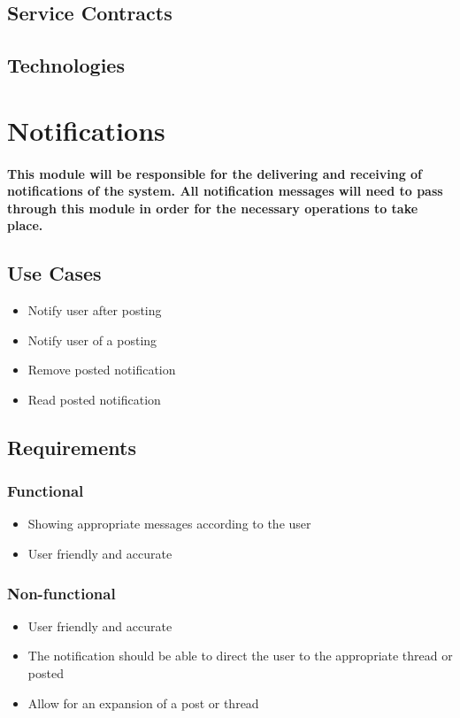 \documentclass[12pt]{article}
\begin{document}
\subsection{Service Contracts}
\paragraph{}
	 	 
\subsection{Technologies}
\paragraph{}
\section{Notifications}
\paragraph{This module will be responsible for the delivering and receiving of notifications of the system. All notification messages will need to pass through this module in order for the necessary operations to take place.}
\subsection{Use Cases}
\begin{itemize}
\item Notify user after posting
\item Notify user of a posting
\item Remove posted notification 
\item Read posted notification
\end{itemize}
\subsection{Requirements}
\subsubsection{Functional}
\begin{itemize}
\item Showing appropriate messages according to the user
\item User friendly and accurate
\end{itemize}
\subsubsection{Non-functional}
\begin{itemize}
\item User friendly and accurate
\item The notification should be able to direct the user to the appropriate thread or posted
\item Allow for an expansion of a post or thread 
\end{itemize}
\end{document}
